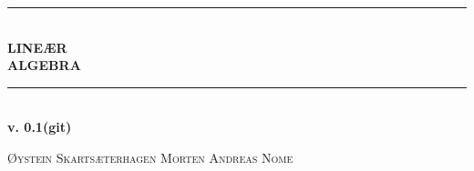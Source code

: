 \onecolumn
\thispagestyle{empty}
\hbox{}
\vspace{160pt}

\noindent

\begin{center}
\rule{420pt}{4pt}\\[4pt]
\fontsize{90pt}{70pt}\selectfont
\textbf{LINEÆR}\\
\fontsize{76pt}{70pt}\selectfont
\textbf{ALGEBRA}
\\[-50pt]
\rule{420pt}{4pt}
\\[30pt]
\Huge \textbf{v. 0.1(git)}
\end{center}

\vfill
\begin{center}
\begin{minipage}{420pt}
\LARGE
\textsc{Øystein Skartsæterhagen}
\hfill
\textsc{Morten Andreas Nome}
\end{minipage}
\end{center}

\vspace{40pt}

\twocolumn
